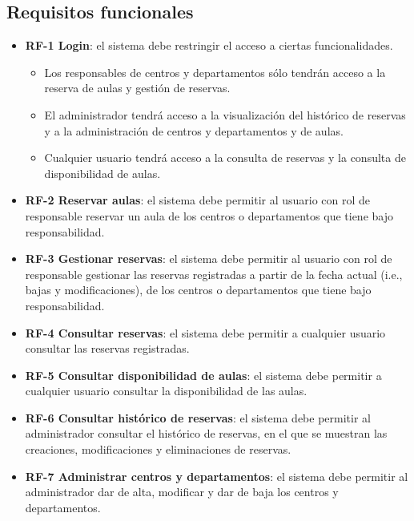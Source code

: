 \subsection{Requisitos funcionales}
\begin{itemize}
	\item \textbf{RF-1 Login}: el sistema debe restringir el acceso a ciertas funcionalidades.
	    \begin{itemize}
	        \item Los responsables de centros y departamentos sólo tendrán acceso a la reserva de aulas y gestión de reservas.
	        \item El administrador tendrá acceso a la visualización del histórico de reservas y a la administración de centros y departamentos y de aulas.
	        \item Cualquier usuario tendrá acceso a la consulta de reservas y la consulta de disponibilidad de aulas.
	    \end{itemize}
	    
	\item \textbf{RF-2 Reservar aulas}: el sistema debe permitir al usuario con rol de responsable reservar un aula
        de los centros o departamentos que tiene bajo responsabilidad.
        
	\item \textbf{RF-3 Gestionar reservas}: el sistema debe permitir al usuario con rol de responsable gestionar las reservas registradas a partir de la fecha actual (i.e., bajas y modificaciones), de los centros o departamentos que tiene bajo responsabilidad.
        
	\item \textbf{RF-4 Consultar reservas}: el sistema debe permitir a cualquier usuario consultar las reservas registradas.
	\item 
	    \textbf{RF-5 Consultar disponibilidad de aulas}: el sistema debe permitir a cualquier usuario consultar la disponibilidad de las aulas.
	    
	\item \textbf{RF-6 Consultar histórico de reservas}: el sistema debe permitir al administrador consultar el histórico de reservas, en el que se muestran las creaciones, modificaciones y eliminaciones de reservas.
	    
	\item \textbf{RF-7 Administrar centros y departamentos}: el sistema debe permitir al administrador dar de alta, modificar y dar de baja los centros y departamentos.
	    

\end{itemize}
